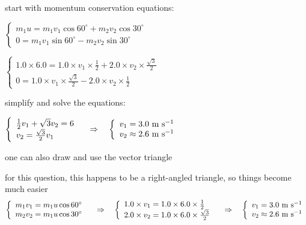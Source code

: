 
\begin{soln} start with momentum conservation equations:

\eqskip$\left\{\begin{array}{l}
	m_1 u = m_1 v_1 \cos60^\circ + m_2 v_2 \cos30^\circ \\
	0 = m_1 v_1 \sin60^\circ - m_2 v_2 \sin30^\circ
	\end{array} \right. $

\eqskip $ \left\{\begin{array}{l}
	1.0\times6.0 = 1.0 \times v_1 \times \frac{1}{2} + 2.0 \times v_2 \times \frac{\sqrt{3}}{2}  \\
	0 = 1.0 \times v_1 \times \frac{\sqrt{3}}{2} - 2.0 \times v_2 \times \frac{1}{2}
	\end{array} \right. $

\eqyskip simplify and solve the equations:

\eqskip $ \left\{\begin{array}{l}
\frac{1}{2} v_1 + \sqrt{3} v_2 = 6 \\
v_2 =  \frac{\sqrt{3}}{2} v_1
\end{array} \right. \quad \Rightarrow \quad 
\left\{\begin{array}{l}
v_1 = 3.0 \text{ m s$^{-1}$} \\
v_2 \approx 2.6 \text{ m s$^{-1}$}
\end{array} \right.$

\eqyskip one can also draw and use the vector triangle

for this question, this happens to be a right-angled triangle, so things become much easier
\begin{equation*}
	\left\{\begin{array}{l}
	m_1 v_1 = m_1 u \cos 60^\circ \\
	m_2 v_2 = m_1 u \cos 30^\circ
	\end{array} \right. \quad \Rightarrow \quad 
	\left\{\begin{array}{l}
	1.0\times v_1 = 1.0 \times 6.0 \times \frac{1}{2} \\
	2.0\times v_2 = 1.0 \times 6.0 \times \frac{\sqrt{3}}{2}
	\end{array} \right.	\quad \Rightarrow \quad 
	\left\{\begin{array}{l}
	v_1 = 3.0 \text{ m s$^{-1}$} \\
	v_2 \approx 2.6 \text{ m s$^{-1}$}
	\end{array} \right.  
\end{equation*}
\end{soln}




